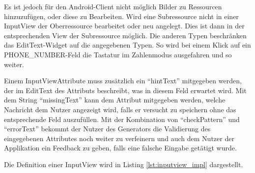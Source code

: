 Es ist jedoch für den Android-Client nicht möglich Bilder zu Ressourcen hinzuzufügen, oder diese zu Bearbeiten. Wird eine Subressource nicht in einer InputView der Oberressource bearbeitet oder neu angelegt. Dies ist dann in der entsprechenden View der Subressource möglich. Die anderen Typen beschränken das EditText-Widget auf die angegebenen Typen. So wird bei einem Klick auf ein PHONE\_NUMBER-Feld die Tastatur im Zahlenmodus ausgefahren und so weiter.

Einem InputViewAttribute muss zusätzlich ein \enquote{hintText} mitgegeben werden, der im EditText des Attributs beschreibt, was in diesem Feld erwartet wird. Mit dem String \enquote{missingText} kann dem Attribut mitgegeben werden, welche Nachricht dem Nutzer angezeigt wird, falls er versucht zu speichern ohne das entsprechende Feld auszufüllen. Mit der Kombination von \enquote{checkPattern} und \enquote{errorText} bekommt der Nutzer des Generators die Validierung des eingegebenen Attributes noch weiter zu verfeinern und auch dem Nutzer der Applikation ein Feedback zu geben, falls eine falsche Eingabe getätigt wurde.

Die Definition einer InputView wird in Listing \ref{lst:inputview_impl} dargestellt.


